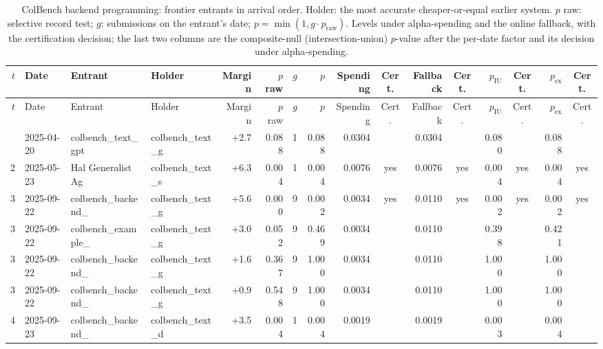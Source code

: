{\begin{longtable}{rlllrrrrrcrcrcrc}
\caption{ColBench backend programming: frontier entrants in arrival order. Holder: the most accurate cheaper-or-equal earlier system. $p$ raw: selective record test; $g$: submissions on the entrant's date; $p = \min(1, g \cdot p_{\mathrm{raw}})$. Levels under alpha-spending and the online fallback, with the certification decision; the last two columns are the composite-null (intersection-union) $p$-value after the per-date factor and its decision under alpha-spending.}\label{tab:supp-cert-hal_colbench_backend_programming}\\
\toprule
$t$ & Date & Entrant & Holder & Margin & $p$ raw & $g$ & $p$ & Spending & Cert. & Fallback & Cert. & $p_{\mathrm{IU}}$ & Cert. & $p_{\mathrm{ex}}$ & Cert. \\
\midrule
\endfirsthead
\toprule
$t$ & Date & Entrant & Holder & Margin & $p$ raw & $g$ & $p$ & Spending & Cert. & Fallback & Cert. & $p_{\mathrm{IU}}$ & Cert. & $p_{\mathrm{ex}}$ & Cert. \\
\midrule
\endhead
\bottomrule
\endfoot
1 & 2025-04-20 & colbench\_text\_gpt~ & colbench\_text\_g~ & +2.7 & 0.088 & 1 & 0.088 & 0.0304 &  & 0.0304 &  & 0.080 &  & 0.088 &  \\
2 & 2025-05-23 & Hal Generalist Ag~ & colbench\_text\_s~ & +6.3 & 0.004 & 1 & 0.004 & 0.0076 & yes & 0.0076 & yes & 0.004 & yes & 0.004 & yes \\
3 & 2025-09-22 & colbench\_backend\_~ & colbench\_text\_g~ & +5.6 & 0.000 & 9 & 0.002 & 0.0034 & yes & 0.0110 & yes & 0.002 & yes & 0.002 & yes \\
3 & 2025-09-22 & colbench\_example\_~ & colbench\_text\_g~ & +3.0 & 0.052 & 9 & 0.469 & 0.0034 &  & 0.0110 &  & 0.398 &  & 0.421 &  \\
3 & 2025-09-22 & colbench\_backend\_~ & colbench\_text\_g~ & +1.6 & 0.367 & 9 & 1.000 & 0.0034 &  & 0.0110 &  & 1.000 &  & 1.000 &  \\
3 & 2025-09-22 & colbench\_backend\_~ & colbench\_text\_g~ & +0.9 & 0.548 & 9 & 1.000 & 0.0034 &  & 0.0110 &  & 1.000 &  & 1.000 &  \\
4 & 2025-09-23 & colbench\_backend\_~ & colbench\_text\_d~ & +3.5 & 0.004 & 1 & 0.004 & 0.0019 &  & 0.0019 &  & 0.003 &  & 0.004 &  \\
\end{longtable}

}
